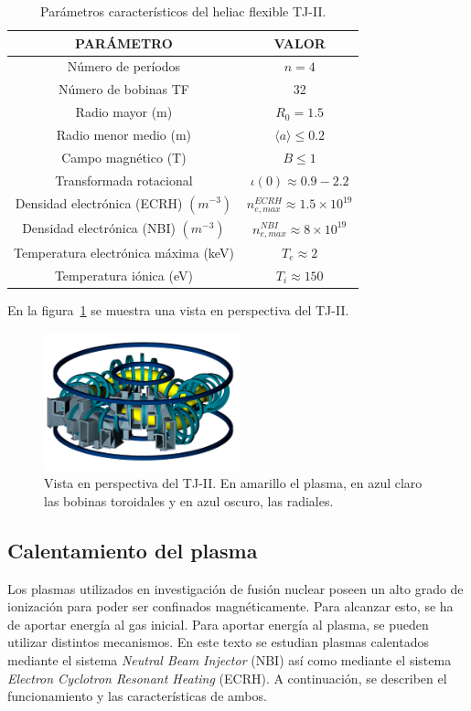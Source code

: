 \begin{table}[H]
    \centering
    \begin{tabular}{cc}
    \hline
    PARÁMETRO & VALOR \\ \hline
    Número de períodos          & $n=4$       \\
    Número de bobinas TF          & 32       \\
    Radio mayor (m)          & $R_0=1.5$      \\
    Radio menor medio (m)          & $\langle a\rangle\leq 0.2$       \\
    Campo magnético (T)          & $B\leq 1$       \\
    Transformada rotacional          & $\iota(0)\approx0.9-2.2$       \\
    Densidad electrónica (ECRH) $(m^{-3})$          & $n^{ECRH}_{e,max}\approx 1.5\times 10^{19}$       \\
    Densidad electrónica (NBI) $(m^{-3})$          & $n^{NBI}_{e,max}\approx 8\times 10^{19}$       \\
    Temperatura electrónica máxima (keV)          & $T_e\approx 2$      \\
    Temperatura iónica (eV)          & $T_i\approx 150$      \\ \hline
    \end{tabular}
    \caption{Parámetros característicos del heliac flexible TJ-II.}
    \label{tab:tj2}
\end{table}
En la figura~\ref{fig:view} se muestra una vista en perspectiva del TJ-II.
\begin{figure}[h!]
    \centering
    \includegraphics[height=4cm]{img/view.png}
    \caption[Vista en perspectiva del TJ-II]{Vista en perspectiva del TJ-II. En amarillo el plasma, en azul claro las bobinas toroidales y en azul oscuro, las radiales.}
    \label{fig:view}
\end{figure}
\subsection{Calentamiento del plasma}
Los plasmas utilizados en investigación de fusión nuclear poseen un alto grado de ionización 
para poder ser confinados magnéticamente. Para alcanzar esto, se ha de aportar energía al
gas inicial.
Para aportar energía al plasma, se pueden utilizar distintos mecanismos. En este texto se estudian
plasmas calentados mediante el sistema \textit{Neutral Beam Injector} (NBI) así como mediante
el sistema \textit{Electron Cyclotron Resonant Heating} (ECRH). A continuación, se describen
el funcionamiento y las características de ambos.
